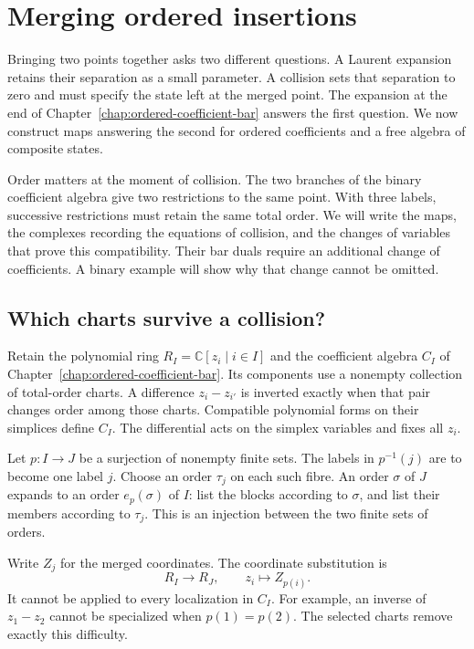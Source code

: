 \chapter{Merging ordered insertions}
\label{chap:merging-ordered-insertions}

Bringing two points together asks two different questions.
A Laurent expansion retains their separation as a small parameter.
A collision sets that separation to zero and must specify the state
left at the merged point.
The expansion at the end of
Chapter~\ref{chap:ordered-coefficient-bar} answers the first question.
We now construct maps answering the second for ordered coefficients
and a free algebra of composite states.

Order matters at the moment of collision.
The two branches of the binary coefficient algebra give two
restrictions to the same point.
With three labels, successive restrictions must retain the same
total order.
We will write the maps, the complexes recording the equations of
collision, and the changes of variables that prove this compatibility.
Their bar duals require an additional change of coefficients.
A binary example will show why that change cannot be omitted.

\section{Which charts survive a collision?}

Retain the polynomial ring $R_I=\mathbb C[z_i\mid i\in I]$ and
the coefficient algebra $C_I$ of
Chapter~\ref{chap:ordered-coefficient-bar}.
Its components use a nonempty collection of total-order charts.
A difference $z_i-z_{i'}$ is inverted exactly when that pair
changes order among those charts.
Compatible polynomial forms on their simplices define $C_I$.
The differential acts on the simplex variables and fixes all $z_i$.

Let $p:I\to J$ be a surjection of nonempty finite sets.
The labels in $p^{-1}(j)$ are to become one label $j$.
Choose an order $\tau_j$ on each such fibre.
An order $\sigma$ of $J$ expands to an order $e_p(\sigma)$ of $I$:
list the blocks according to $\sigma$, and list their members
according to $\tau_j$.
This is an injection between the two finite sets of orders.

Write $Z_j$ for the merged coordinates.
The coordinate substitution is
\[
 R_I\longrightarrow R_J,\qquad z_i\longmapsto Z_{p(i)}.
\]
It cannot be applied to every localization in $C_I$.
For example, an inverse of $z_1-z_2$ cannot be specialized when
$p(1)=p(2)$.
The selected charts remove exactly this difficulty.

